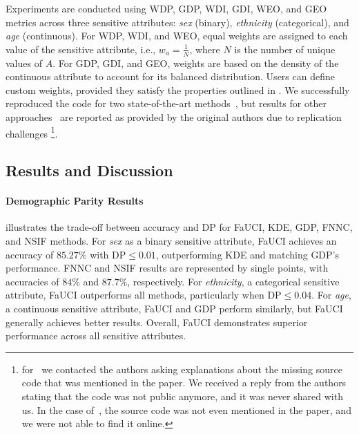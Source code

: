 %
Experiments are conducted using \gls{WDP}, \gls{GDP}, \gls{WDI}, \gls{GDI}, \gls{WEO}, and \gls{GEO} metrics across three sensitive attributes: \emph{sex} (binary), \emph{ethnicity} (categorical), and \emph{age} (continuous).
%
For \gls{WDP}, \gls{WDI}, and \gls{WEO}, equal weights are assigned to each value of the sensitive attribute, i.e., \(w_a = \frac{1}{N}\), where \(N\) is the number of unique values of \(A\).
%
For \gls{GDP}, \gls{GDI}, and \gls{GEO}, weights are based on the density of the continuous attribute to account for its balanced distribution.
%
Users can define custom weights, provided they satisfy the properties outlined in .
%
We successfully reproduced the code for two state-of-the-art methods~\cite{DBLP:conf/nips/ChoHS20,DBLP:conf/iclr/JiangHFYMH22}, but results for other approaches~\cite{DBLP:conf/ijcai/ManishaG20,DBLP:conf/aaaiss/WagnerG21} are reported as provided by the original authors due to replication challenges
%
\footnote{
    for~\cite{DBLP:conf/aaaiss/WagnerG21} we contacted the authors asking explanations about the missing source code that was mentioned in the paper.
    We received a reply from the authors stating that the code was not public anymore, and it was never shared with us.
    In the case of~\cite{DBLP:conf/ijcai/ManishaG20}, the source code was not even mentioned in the paper, and we were not able to find it online.
}.

\subsection{Results and Discussion}\label{subsec:results-fauci}
%

%
%
\paragraph{Demographic Parity Results}
%
 illustrates the trade-off between accuracy and \gls{DP} for \gls{FaUCI}, \gls{KDE}, \gls{GDP}, \gls{FNNC}, and \gls{NSIF} methods.
%
For \emph{sex} as a binary sensitive attribute, \gls{FaUCI} achieves an accuracy of \(85.27\%\) with \(\text{DP} \leq 0.01\), outperforming \gls{KDE} and matching \gls{GDP}'s performance.
%
\gls{FNNC} and \gls{NSIF} results are represented by single points, with accuracies of \(84\%\) and \(87.7\%\), respectively.
%
For \emph{ethnicity}, a categorical sensitive attribute, \gls{FaUCI} outperforms all methods, particularly when \(\text{DP} \leq 0.04\).
%
For \emph{age}, a continuous sensitive attribute, \gls{FaUCI} and \gls{GDP} perform similarly, but \gls{FaUCI} generally achieves better results.
%
Overall, \gls{FaUCI} demonstrates superior performance across all sensitive attributes.


